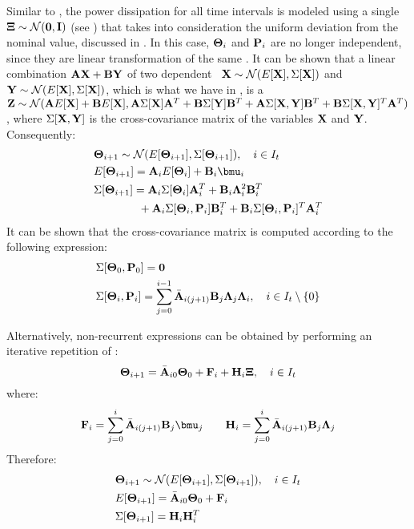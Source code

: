 Similar to , the power dissipation for all time intervals is modeled using a single \msnrv\ $\mathbf{\Xi} \sim \mathcal{N}(\mathbf{0}, \mathbf{I})$ (see ) that takes into consideration the uniform deviation from the nominal value, discussed in . In this case, $\mathbf{\Theta}_i$ and $\mathbf{P}_i$ are no longer independent, since they are linear transformation of the same \mrv. It can be shown that a linear combination $\mathbf{A} \mathbf{X} + \mathbf{B} \mathbf{Y}$ of two dependent \mnrvs\ $\mathbf{X} \sim \mathcal{N}(E[\mathbf{X}], \Sigma[\mathbf{X}])$ and $\mathbf{Y} \sim \mathcal{N}(E[\mathbf{X}], \Sigma[\mathbf{X}])$, which is what we have in , is a \mnrv\ $\mathbf{Z} \sim \mathcal{N}(\mathbf{A} E[\mathbf{X}] + \mathbf{B} E[\mathbf{X}], \mathbf{A} \Sigma[\mathbf{X}] \mathbf{A}^T + \mathbf{B} \Sigma[\mathbf{Y}] \mathbf{B}^T + \mathbf{A} \Sigma[\mathbf{X}, \mathbf{Y}] \mathbf{B}^T + \mathbf{B} \Sigma[\mathbf{X}, \mathbf{Y}]^T \mathbf{A}^T)$, where $\Sigma[\mathbf{X}, \mathbf{Y}]$ is the cross-covariance matrix of the variables $\mathbf{X}$ and $\mathbf{Y}$. Consequently:
\begin{align*}
  & \vtemperature_{i + 1} \sim \normal(\expectation{\vtemperature_{i + 1}}, \covariance{\vtemperature_{i + 1}}), \sep i \in \timeindex \\
  & \expectation{\vtemperature_{i + 1}} = \m{A}_i \expectation{\vtemperature_i} + \m{B}_i \vmean{i} \\
  & \covariance{\vtemperature_{i + 1}} = \m{A}_i \covariance{\vtemperature_i} \m{A}_i^T + \m{B}_i \ddeviation{i}^2 \m{B}_i^T \\
  & {} \qquad \qquad + \m{A}_i \covariance{\vtemperature_i, \vpower_i} \m{B}_i^T + \m{B}_i \covariance{\vtemperature_i, \vpower_i}^T \m{A}_i^T
\end{align*}
It can be shown that the cross-covariance matrix is computed according to the following expression:
\begin{align}
  & \covariance{\vtemperature_0, \vpower_0} = \mzero \nonumber \\
  & \covariance{\vtemperature_i, \vpower_i} = \sum_{j = 0}^{i - 1} \am{A}_{i(j+1)} \m{B}_j \ddeviation{j} \ddeviation{i}, \sep i \in \timeindex \setminus \{0\}  \equlabel{cross-covariance}
\end{align}

Alternatively, non-recurrent expressions can be obtained by performing an iterative repetition of :
\begin{equation} \equlabel{ta-fourier-non-recurrent}
  \vtemperature_{i + 1} = \am{A}_{i0} \vtemperature_0 + \v{F}_i + \v{H}_i \vstdnormal, \sep i \in \timeindex
\end{equation}
where:
\[
  \v{F}_i = \sum_{j = 0}^{i} \am{A}_{i(j+1)} \m{B}_j \vmean{j} \sep \sep \v{H}_i = \sum_{j = 0}^{i} \am{A}_{i(j+1)} \m{B}_j \ddeviation{j}
\]
Therefore:
\begin{align*}
  & \mathbf{\Theta}_{i + 1} \sim \mathcal{N}(E[\mathbf{\Theta}_{i + 1}], \Sigma[\mathbf{\Theta}_{i + 1}]), \hspace{10pt} i \in I_t \\
  & E[\mathbf{\Theta}_{i + 1}] = \Bar{\mathbf{A}}_{i0} \mathbf{\Theta}_0 + \mathbf{F}_i \\
  & \Sigma[\mathbf{\Theta}_{i + 1}] = \mathbf{H}_i \mathbf{H}_i^T
\end{align*}
